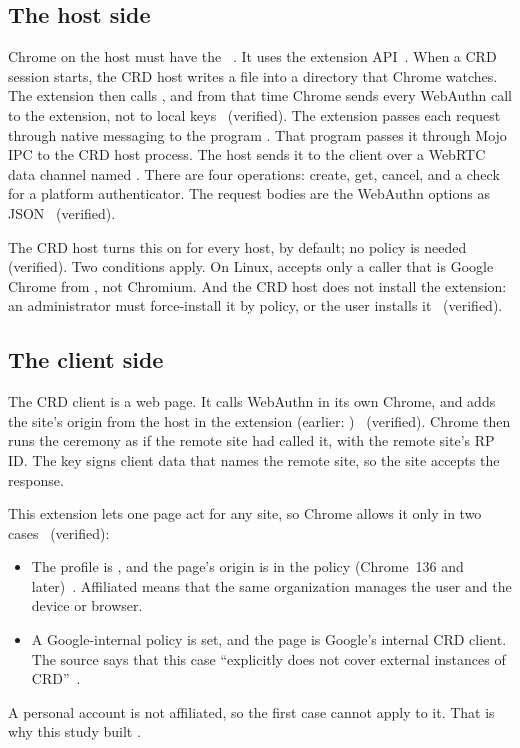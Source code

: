 \subsection{The host side}

Chrome on the host must have the ~\cite{crdext}. It uses the 
extension API~\cite{wap}. When a CRD session starts, the CRD host writes a
file into a directory that Chrome watches. The extension then calls
, and from that time Chrome sends every WebAuthn call to the
extension, not to local keys~\cite{crdhost} (verified). The extension passes
each request through native messaging to the program
. That program passes it through Mojo IPC to the CRD
host process. The host sends it to the client over a WebRTC data channel
named . There are four operations: create, get,
cancel, and a check for a platform authenticator. The request bodies are the
WebAuthn options as JSON~\cite{crdhost} (verified).

The CRD host turns this on for every host, by default; no policy is
needed~\cite{crdhost} (verified). Two conditions apply. On Linux,
 accepts only a caller that is Google Chrome from
, not Chromium. And the CRD host does not install
the extension: an administrator must force-install it by policy, or the
user installs it~\cite{crdhost} (verified).

\subsection{The client side}

The CRD client is a web page. It calls WebAuthn in its own Chrome, and adds
the site's origin from the host in the extension 
(earlier: )~\cite{webauthn-ed} (verified).
Chrome then runs the ceremony as if the remote site had called it, with the
remote site's RP ID. The key signs client data that names the remote site,
so the site accepts the response.

This extension lets one page act for any site, so Chrome allows it only in
two cases~\cite{crdclient} (verified):
\begin{itemize}
\item The profile is , and the page's origin is in the
      policy \allowbreak{}\allowbreak{}
      (Chrome~136 and later)~\cite{crdallow}. Affiliated means that the
      same organization manages the user and the device or browser.
\item A Google-internal policy is set, and the page is Google's internal
      CRD client. The source says that this case ``explicitly does not
      cover external instances of CRD''~\cite{crdclient}.
\end{itemize}
A personal  account is not affiliated, so the first case
cannot apply to it. That is why this study built .

